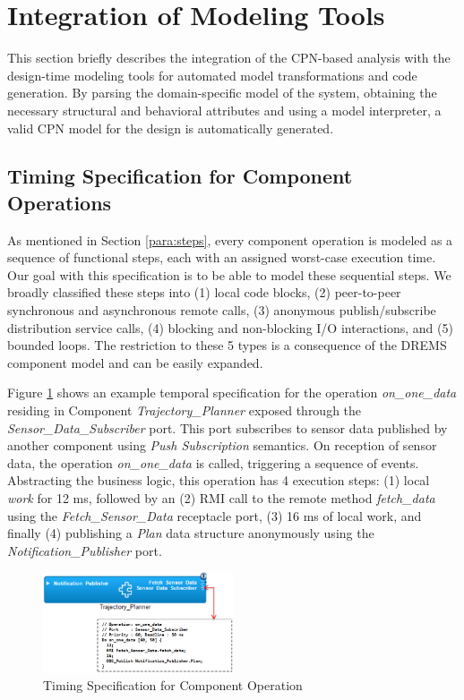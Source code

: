 \section{Integration of Modeling Tools}
\label{sec:IMT}

This section briefly describes the integration of the CPN-based analysis with the design-time modeling tools for automated model transformations and code generation. By parsing the domain-specific model of the system, obtaining the necessary structural and behavioral attributes and using a model interpreter, a valid CPN model for the design is automatically generated.

\subsection{Timing Specification for Component Operations}

As mentioned in Section \ref{para:steps}, every component operation is modeled as a sequence of functional steps, each with an assigned worst-case execution time. Our goal with this specification is to be able to model these sequential steps. We broadly classified these steps into (1) local code blocks, (2) peer-to-peer synchronous and asynchronous remote calls, (3) anonymous publish/subscribe distribution service calls, (4) blocking  and non-blocking I/O interactions, and (5) bounded loops. The restriction to these 5 types is a consequence of the DREMS component model and can be easily expanded. 

Figure \ref{fig:ANTLR} shows an example temporal specification for the operation \emph{on\_one\_data} residing in Component \emph{Trajectory\_Planner} exposed through the \emph{Sensor\_Data\_Subscriber} port. This port subscribes to sensor data published by another component using \emph{Push Subscription} semantics. On reception of sensor data, the operation \emph{on\_one\_data} is called, triggering a sequence of events. Abstracting the business logic, this operation has 4 execution steps: (1) local \emph{work} for 12 ms, followed by an (2) RMI call to the remote method \emph{fetch\_data} using the \emph{Fetch\_Sensor\_Data} receptacle port, (3) 16 ms of local work, and finally (4) publishing a \emph{Plan} data structure anonymously using the \emph{Notification\_Publisher} port. 

\vspace{-0.1in}
\begin{figure}[htb]
	\centering
	\includegraphics[width=0.50\textwidth]{figs/Timing_Specification.png}
	\caption{Timing Specification for Component Operation}
	\label{fig:ANTLR}
\end{figure}

